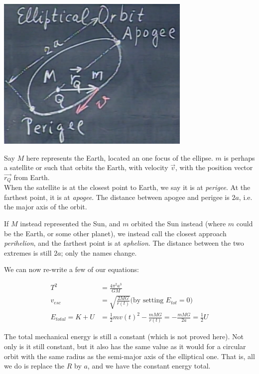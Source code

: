 \documentclass[8.01x]{subfiles}
\begin{document}
\begin{center}
\includegraphics[scale=0.6]{Graphics/lec22_elliptical_orbit}
\end{center}

Say $M$ here represents the Earth, located an one focus of the ellipse. $m$ is perhaps a satellite or such that orbits the Earth, with velocity $\vec{v}$, with the position vector $\vec{r_Q}$ from Earth.\\
When the satellite is at the closest point to Earth, we say it is at \emph{perigee}. At the farthest point, it is at \emph{apogee}. The distance between apogee and perigee is $2a$, i.e. the major axis of the orbit.

If $M$ instead represented the Sun, and $m$ orbited the Sun instead (where $m$ could be the Earth, or some other planet), we instead call the closest approach \emph{perihelion}, and the farthest point is at \emph{aphelion}. The distance between the two extremes is still $2a$; only the names change.

We can now re-write a few of our equations:

\begin{align}
T^2 &= \frac{4 \pi^2 a^3}{G M}\\
v_{esc} &= \sqrt{\frac{2 M G}{r(t)}} \text{(by setting $E_{tot} = 0$)}\\
E_{total} = K + U &= \frac{1}{2} m v(t)^2 - \frac{m M G}{r(t)} = - \frac{m M G}{2a} = \frac{1}{2} U
\end{align}

The total mechanical energy is still a constant (which is not proved here). Not only is it still constant, but it also has the same value as it would for a circular orbit with the same radius as the semi-major axis of the elliptical one. That is, all we do is replace the $R$ by $a$, and we have the constant energy total.
\end{document}
